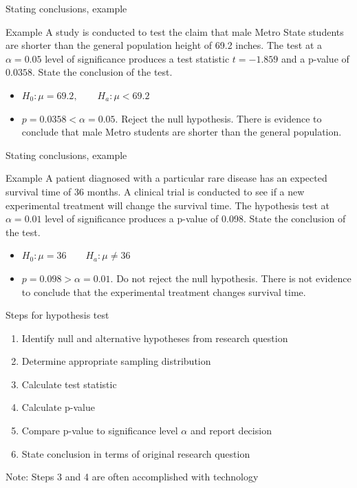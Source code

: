 \documentclass[xcolor=table]{beamer}
\begin{document}
\begin{frame}{Stating conclusions, example}
\begin{exampleblock}{Example}
\large
A study is conducted to test the claim that male Metro State students are shorter than the general population height of 69.2 inches. The test at a $\alpha=0.05$ level of significance produces a test statistic $t=-1.859$ and a p-value of $0.0358$. State the conclusion of the test.
\begin{itemize}
\pause\item $H_0: \mu=69.2, \qquad H_a: \mu < 69.2$
\pause\item $p=0.0358 < \alpha = 0.05$. Reject the null hypothesis. There is evidence to conclude that male Metro students are shorter than the general population.
\end{itemize}
\end{exampleblock}
\end{frame}

\begin{frame}{Stating conclusions, example}
\begin{exampleblock}{Example}
\large
A patient diagnosed with a particular rare disease has an expected survival time of 36 months. A clinical trial is conducted to see if a new experimental treatment will change the survival time. The hypothesis test at $\alpha = 0.01$ level of significance produces a p-value of 0.098. State the conclusion of the test.
\begin{itemize}
\pause\item $H_0: \mu = 36 \qquad H_a: \mu \ne 36$
\pause\item $p=0.098 > \alpha = 0.01$. Do not reject the null hypothesis. There is not evidence to conclude that the experimental treatment changes survival time.
\end{itemize}\end{exampleblock}
\end{frame}

\begin{frame}{Steps for hypothesis test}
\begin{block}{}
\large
\begin{enumerate}
\item Identify null and alternative hypotheses from research question
\item Determine appropriate sampling distribution
\item Calculate test statistic
\item Calculate p-value
\item Compare p-value to significance level $\alpha$ and report decision
\item State conclusion in terms of original research question
\end{enumerate}
Note: Steps 3 and 4 are often accomplished with technology
\end{block}
\end{frame}
\end{document}
